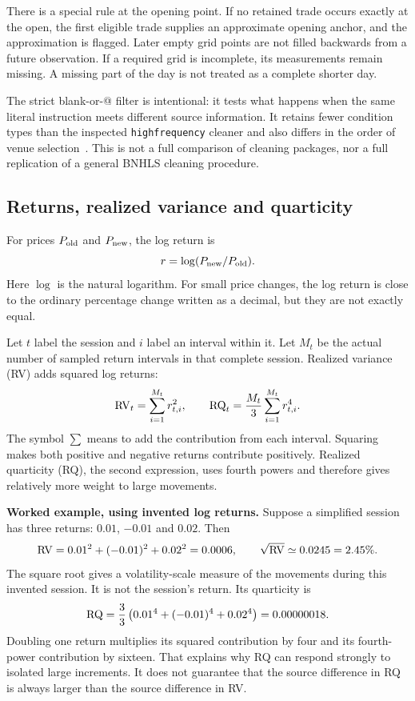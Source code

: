 There is a special rule at the opening point. If no retained trade occurs exactly at the open, the first eligible trade supplies an approximate opening anchor, and the approximation is flagged. Later empty grid points are not filled backwards from a future observation. If a required grid is incomplete, its measurements remain missing. A missing part of the day is not treated as a complete shorter day.

The strict blank-or-@ filter is intentional: it tests what happens when the same literal instruction meets different source information. It retains fewer condition types than the inspected \texttt{highfrequency} cleaner and also differs in the order of venue selection~\cite{highfrequency}. This is not a full comparison of cleaning packages, nor a full replication of a general BNHLS cleaning procedure.

\subsection{Returns, realized variance and quarticity}
For prices $P_{\rm old}$ and $P_{\rm new}$, the log return is
\[
 r=\log(P_{\rm new}/P_{\rm old}).
\]
Here $\log$ is the natural logarithm. For small price changes, the log return is close to the ordinary percentage change written as a decimal, but they are not exactly equal.

Let $t$ label the session and $i$ label an interval within it. Let $M_t$ be the actual number of sampled return intervals in that complete session. Realized variance (RV) adds squared log returns:
\begin{equation}
 \operatorname{RV}_t=\sum_{i=1}^{M_t}r_{t,i}^2,\qquad
 \operatorname{RQ}_t=\frac{M_t}{3}\sum_{i=1}^{M_t}r_{t,i}^4.\label{eq:moments}
\end{equation}
The symbol $\sum$ means to add the contribution from each interval. Squaring makes both positive and negative returns contribute positively. Realized quarticity (RQ), the second expression, uses fourth powers and therefore gives relatively more weight to large movements.

\textbf{Worked example, using invented log returns.} Suppose a simplified session has three returns: $0.01$, $-0.01$ and $0.02$. Then
\[
 \operatorname{RV}=0.01^2+(-0.01)^2+0.02^2=0.0006,
 \qquad \sqrt{\operatorname{RV}}\simeq 0.0245=2.45\%.
\]
The square root gives a volatility-scale measure of the movements during this invented session. It is not the session's return. Its quarticity is
\[
 \operatorname{RQ}=\frac{3}{3}\left(0.01^4+(-0.01)^4+0.02^4\right)
     =0.00000018.
\]
Doubling one return multiplies its squared contribution by four and its fourth-power contribution by sixteen. That explains why RQ can respond strongly to isolated large increments. It does not guarantee that the source difference in RQ is always larger than the source difference in RV.

